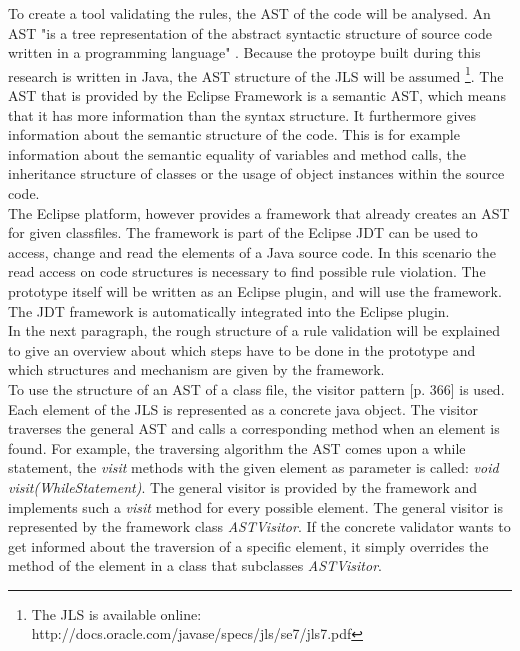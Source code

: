 To create a tool validating the rules, the \acf{AST} of the code will be analysed. An \acf{AST} "is a tree representation of the abstract syntactic structure of source code written in a programming language" \cite[Abstract Syntax Tree]{wiki}. Because the protoype built during this research is written in Java, the \acf{AST} structure of the \acf{JLS} will be assumed \footnote{The \acf{JLS} is available online: http://docs.oracle.com/javase/specs/jls/se7/jls7.pdf}. The \acf{AST} that is provided by the Eclipse Framework is a semantic \acf{AST}, which means that it has more information than the syntax structure. It furthermore gives information about the semantic structure of the code. This is for example information about the semantic equality of variables and method calls, the inheritance structure of classes or the usage of object instances within the source code.
\\

The Eclipse platform, however provides a framework that already creates an \acf{AST} for given classfiles. The framework is part of the Eclipse \acf{JDT} can be used to access, change and read the elements of a Java source code. In this scenario the read access on code structures is necessary to find possible rule violation. The prototype itself will be written as an Eclipse plugin, and will use the framework. The \acf{JDT} framework is automatically integrated into the Eclipse plugin. 
\\


In the next paragraph, the rough structure of a rule validation will be explained to give an overview about which steps have to be done in the prototype and which structures and mechanism are given by the framework.
\\

To use the structure of an \acf{AST} of a class file, the visitor pattern \cite{gof}[p. 366] is used. Each element of the \acf{JLS} is represented as a concrete java object. The visitor traverses the general \acf{AST} and calls a corresponding method when an element is found. For example, the traversing algorithm the \acf{AST} comes upon a while statement, the \textit{visit} methods with the given element as parameter is called: \textit{void visit(WhileStatement)}. The general visitor is provided by the framework and implements such a \textit{visit} method for every possible element. The general visitor is represented by the framework class \textit{ASTVisitor}. If the concrete validator wants to get informed about the traversion of a specific element, it simply overrides the method of the element in a class that subclasses \textit{ASTVisitor}. 
\\

